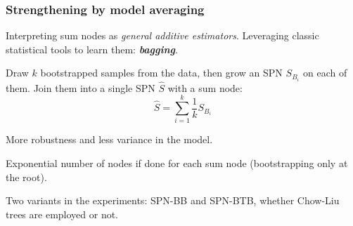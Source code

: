 \documentclass[xcolor={usenames,dvipsnames,svgnames}, compress]{beamer}
\begin{document}
\begin{frame}
  \frametitle{Strengthening by model averaging}
  \footnotesize
  Interpreting sum nodes as \emph{general additive estimators}. Leveraging
  classic statistical tools to learn them:
  \textbf{\emph{bagging}}.\par\bigskip

  Draw $k$ bootstrapped samples from the data, then grow an SPN $S_{B_i}$ on
  each of them. Join them into a single SPN $\hat{S}$ with a sum node:
  $$\hat{S}=\sum_{i=1}^{k}\frac{1}{k}S_{B_{i}}$$

  More robustness and less variance in the model.\par\bigskip

  Exponential number of nodes if done for each sum node (bootstrapping
  only at the root).\par\bigskip

  Two variants in the experiments: \textsf{SPN-BB} and
  \textsf{SPN-BTB}, whether Chow-Liu trees are employed or not.

  
\end{frame}
\end{document}
